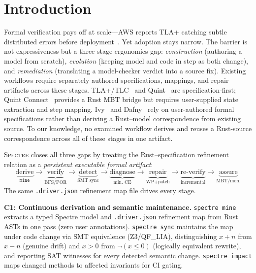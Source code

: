 \documentclass[runningheads]{../paper-vmcai-2027/llncs}
\begin{document}
\section{Introduction}\label{sec:intro}

Formal verification pays off at scale---AWS reports TLA+ catching subtle
distributed errors before deployment~\cite{21_newcombe2015amazon}.
Yet adoption stays narrow.
The barrier is not expressiveness but a three-stage ergonomics gap:
\emph{construction} (authoring a model from scratch),
\emph{evolution} (keeping model and code in step as both change), and
\emph{remediation} (translating a model-checker verdict into a source fix).
Existing workflows require separately authored specifications, mappings, and repair artifacts across these stages.
TLA+/TLC~\cite{16_lamport2002specifying,15_kuppe2019toolbox} and Quint~\cite{12_informal2023quint}
are specification-first; Quint Connect~\cite{13_informal2024quintconnect} provides a Rust MBT
bridge but requires user-supplied state extraction and step mapping.
Ivy~\cite{22_padon2016ivy} and Dafny~\cite{18_leino2010dafny} rely on
user-authored formal specifications rather than deriving a Rust--model
correspondence from existing source.
To our knowledge, no examined workflow derives and reuses a Rust-source
correspondence across all of these stages in one artifact.

\textsc{Spectre} closes all three gaps by treating the Rust--specification
refinement relation as a \emph{persistent executable formal artifact}:
\begin{equation*}
\underbrace{\text{derive}}_{\texttt{mine}}
\!\to\!
\underbrace{\text{verify}}_{\text{BFS/POR}}
\!\to\!
\underbrace{\text{detect}}_{\text{SMT sync}}
\!\to\!
\underbrace{\text{diagnose}}_{\text{min.\ CE}}
\!\to\!
\underbrace{\text{repair}}_{\text{WP+patch}}
\!\to\!
\underbrace{\text{re-verify}}_{\text{incremental}}
\!\to\!
\underbrace{\text{assure}}_{\text{MBT/mon.}}
\end{equation*}
The same \texttt{.driver.json} refinement map file drives every stage.

\smallskip\noindent\textbf{C1: Continuous derivation and semantic maintenance.}
\texttt{spectre mine} extracts a typed Spectre model and \texttt{.driver.json}
refinement map from Rust ASTs in one pass (zero user annotations).
\texttt{spectre sync} maintains the map under code change via SMT equivalence
(Z3/QF\_LIA), distinguishing $x\!+\!n$ from $x\!-\!n$ (genuine drift) and
$x\!>\!0$ from $\neg(x\!\le\!0)$ (logically equivalent rewrite), and reporting
SAT witnesses for every detected semantic change.
\texttt{spectre impact} maps changed methods to affected invariants for CI gating.
\end{document}
